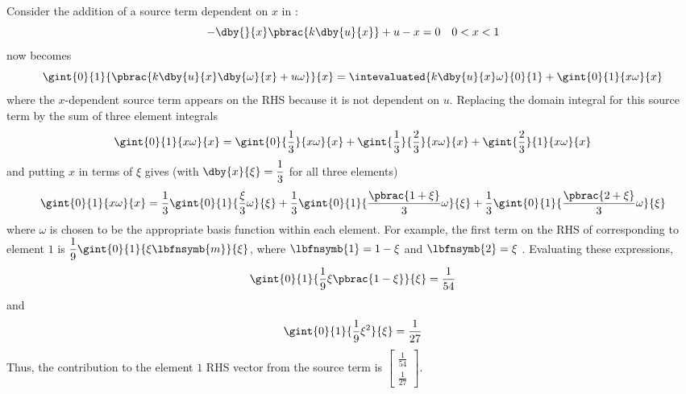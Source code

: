 Consider the addition of a source term dependent on $x$ in 
:
\begin{equation*}
    -\dby{ }{x}\pbrac{k\dby{u}{x}}+u-x=0 \quad 0<x<1
\end{equation*}    
 now becomes
\begin{equation}
  \gint{0}{1}{\pbrac{k\dby{u}{x}\dby{\omega}{x} + u\omega}}{x} 
    = \intevaluated{k\dby{u}{x}\omega}{0}{1} +\gint{0}{1}{x\omega}{x}        
  \label{eqn:source_term_dep}
\end{equation}
where the $x$-dependent source term appears on the RHS because it is not 
dependent on $u$. Replacing the domain integral for this source term by the
sum of three element integrals
\begin{equation*}
  \gint{0}{1}{x\omega}{x}=\gint{0}{\frac13}{x\omega}{x} 
   + \gint{\frac13}{\frac23}{x\omega}{x} + \gint{\frac23}{1}{x\omega}{x}
\end{equation*}
and putting $x$ in terms of $\xi$ gives (with $\dby{x}{\xi}=\dfrac13 $ 
for all three elements)
\begin{equation}
  \gint{0}{1}{x\omega}{x}=\dfrac13\gint{0}{1}{\dfrac{\xi}{3}\omega}{\xi}
    + \dfrac13\gint{0}{1}{\dfrac{\pbrac{1+\xi}}{3}\omega}{\xi} +
    \dfrac13\gint{0}{1}{\dfrac{\pbrac{2+\xi}}{3}\omega}{\xi}
  \label{eqn:x-d.s.t.}
\end{equation}
where $\omega$ is chosen to be the appropriate basis function within each element. 
For example, the first term on the RHS of  corresponding to 
element $1$ is $\dfrac{1}{9}\gint{0}{1}{\xi\lbfnsymb{m}}{\xi}$,
where $\lbfnsymb{1}=1 -\xi$ and $\lbfnsymb{2}=\xi$ . Evaluating these expressions, 
\begin{equation*}
  \gint{0}{1}{\dfrac{1}{9}\xi\pbrac{1-\xi}}{\xi} = \dfrac{1}{54}
\end{equation*}
and
\begin{equation*}
  \gint{0}{1}{\dfrac{1}{9} \xi^{2}}{\xi} = \dfrac{1}{27}
\end{equation*}
Thus, the contribution to the element $1$ RHS vector from the source term is
$\begin{bmatrix}
  \frac{1}{54} \\
  \frac{1}{27}
\end{bmatrix}$.

